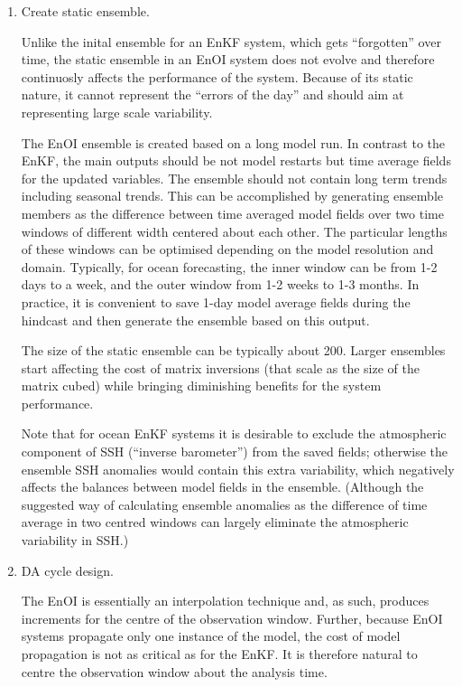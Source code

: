 \documentclass[11pt]{report}
\begin{document}
\begin{enumerate}
  
\item{Create static ensemble.}

  Unlike the inital ensemble for an EnKF system, which gets ``forgotten'' over time, the static ensemble in an EnOI system does not evolve and therefore continuosly affects the performance of the system.
  Because of its static nature, it cannot represent the ``errors of the day'' and should aim at representing large scale variability.

  The EnOI ensemble is created based on a long model run.
  In contrast to the EnKF, the main outputs should be not model restarts but time average fields for the updated variables.
  The ensemble should not contain long term trends including seasonal trends.
  This can be accomplished by generating ensemble members as the difference between time averaged model fields over two time windows of different width centered about each other.
  The particular lengths of these windows can be optimised depending on the model resolution and domain.
  Typically, for ocean forecasting, the inner window can be from 1-2 days to a week, and the outer window from 1-2 weeks to 1-3 months.
  In practice, it is convenient to save 1-day model average fields during the hindcast and then generate the ensemble based on this output.

  The size of the static ensemble can be typically about 200.
  Larger ensembles start affecting the cost of matrix inversions (that scale as the size of the matrix cubed) while bringing diminishing benefits for the system performance.

  Note that for ocean EnKF systems it is desirable to exclude the atmospheric component of SSH (``inverse barometer'') from the saved fields; otherwise the ensemble SSH anomalies would contain this extra variability, which negatively affects the balances between model fields in the ensemble.
  (Although the suggested way of calculating ensemble anomalies as the difference of time average in two centred windows can largely eliminate the atmospheric variability in SSH.)
  
\item {DA cycle design.}

  The EnOI is essentially an interpolation technique and, as such, produces increments for the centre of the observation window.
  Further, because EnOI systems propagate only one instance of the model, the cost of model propagation is not as critical as for the EnKF.
  It is therefore natural to centre the observation window about the analysis time.


\end{enumerate}
\end{document}
